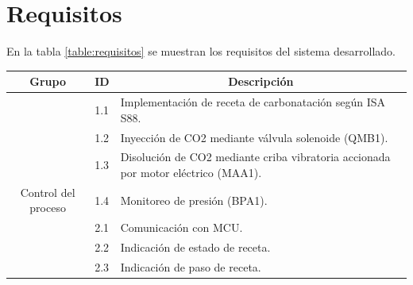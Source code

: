 \section{Requisitos}
En la tabla \ref{table:requisitos} se muestran los requisitos del sistema desarrollado.

\begin{table}[H]
\centering
\begin{tabular}{|c|l|l|}
\hline
\rowcolor[HTML]{EFEFEF} 
\textbf{Grupo}                                                                                  & \multicolumn{1}{c|}{\cellcolor[HTML]{EFEFEF}\textbf{ID}} & \multicolumn{1}{c|}{\cellcolor[HTML]{EFEFEF}\textbf{Descripción}}                 \\ \hline
                                                                                                & 1.1                                                      & Implementación de receta de carbonatación según ISA S88.                          \\ \cline{2-3} 
                                                                                                & 1.2                                                      & Inyección de CO2 mediante válvula solenoide (QMB1).                               \\ \cline{2-3} 
                                                                                                & 1.3                                                      & Disolución de CO2 mediante criba vibratoria accionada por motor eléctrico (MAA1). \\ \cline{2-3} 
\multirow{-4}{*}{Control del proceso}                                                           & 1.4                                                      & Monitoreo de presión (BPA1).                                                      \\ \hline
                                                                                                & 2.1                                                      & Comunicación con MCU.                                                             \\ \cline{2-3} 
                                                                                                & 2.2                                                      & Indicación de estado de receta.                                                   \\ \cline{2-3} 
                                                                                                & 2.3                                                      & Indicación de paso de receta.                                                     \\ \cline{2-3} 

\end{tabular}
\end{table}
